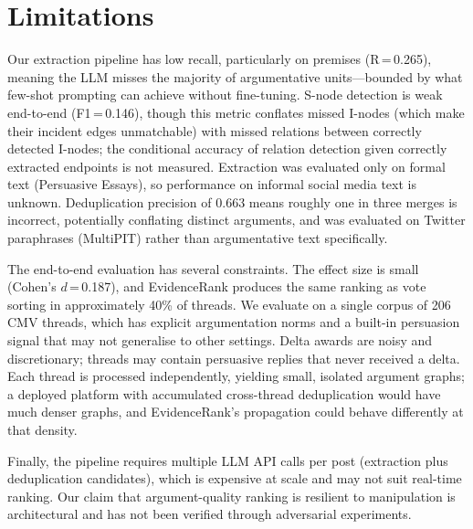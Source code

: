
\section*{Limitations}

Our extraction pipeline has low recall, particularly on premises (R\,=\,0.265), meaning the LLM misses the majority of argumentative units---bounded by what few-shot prompting can achieve without fine-tuning. S-node detection is weak end-to-end (F1\,=\,0.146), though this metric conflates missed I-nodes (which make their incident edges unmatchable) with missed relations between correctly detected I-nodes; the conditional accuracy of relation detection given correctly extracted endpoints is not measured. Extraction was evaluated only on formal text (Persuasive Essays), so performance on informal social media text is unknown. Deduplication precision of 0.663 means roughly one in three merges is incorrect, potentially conflating distinct arguments, and was evaluated on Twitter paraphrases (MultiPIT) rather than argumentative text specifically.

The end-to-end evaluation has several constraints. The effect size is small (Cohen's $d$\,=\,0.187), and EvidenceRank produces the same ranking as vote sorting in approximately 40\% of threads. We evaluate on a single corpus of 206 CMV threads, which has explicit argumentation norms and a built-in persuasion signal that may not generalise to other settings. Delta awards are noisy and discretionary; threads may contain persuasive replies that never received a delta. Each thread is processed independently, yielding small, isolated argument graphs; a deployed platform with accumulated cross-thread deduplication would have much denser graphs, and EvidenceRank's propagation could behave differently at that density.

Finally, the pipeline requires multiple LLM API calls per post (extraction plus deduplication candidates), which is expensive at scale and may not suit real-time ranking. Our claim that argument-quality ranking is resilient to manipulation is architectural and has not been verified through adversarial experiments.
